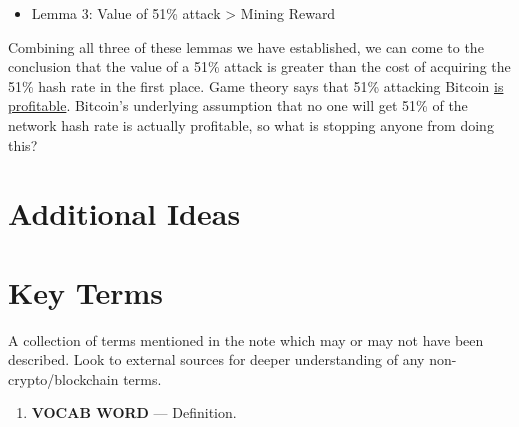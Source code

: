 \documentclass[full.tex]{subfiles}
\begin{document}
    \begin{itemize}
        \item Lemma 3: Value of 51\% attack > Mining Reward
    \end{itemize}
    
    Combining all three of these lemmas we have established, we can come to the conclusion that the value of a 51\% attack is greater than the cost of acquiring the 51\% hash rate in the first place. Game theory says that 51\% attacking Bitcoin \underline{is profitable}. Bitcoin's underlying assumption that no one will get 51\% of the network hash rate is actually profitable, so what is stopping anyone from doing this?
    
    \section*{Additional Ideas}
    
    
    
    
    
    
    
    \newpage
    \thispagestyle{firstpage}
    \vspace*{2\baselineskip}
    \section*{Key Terms}
    \noindent A collection of terms mentioned in the note which may or may not have been described. Look to external sources for deeper understanding of any non-crypto/blockchain terms.
    \begin{enumerate}
        \item \textbf{VOCAB WORD} --- Definition. %
    \end{enumerate}
\end{document}
